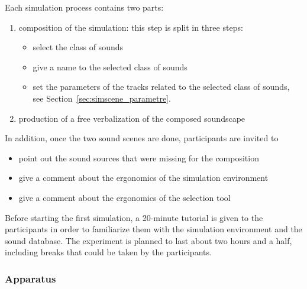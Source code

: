 \documentclass[twoside,twocolumn]{article}
\begin{document}
Each simulation process contains two parts:
\begin{enumerate}
\item composition of the simulation: this step is split in three steps:
\begin{itemize}
  \item  select the class of sounds
	\item  give a name to the selected class of sounds
	\item  set the parameters of the tracks related to the selected class of sounds, see Section~\ref{sec:simscene_parametre}.
\end{itemize}
\item production of a free verbalization of the composed soundscape
\end{enumerate}

In addition, once the two sound scenes are done, participants are invited to
\begin{itemize}
\item  point out the sound sources that were missing for the composition
\item  give a comment about the ergonomics of the simulation environment
\item   give a comment about the ergonomics of the selection tool
\end{itemize}

Before starting the first simulation, a 20-minute tutorial is given to the participants in order to familiarize them with the simulation environment and the sound database. The experiment is planned to last about two hours and a half, including breaks that could be taken by the participants.

\subsubsection*{Apparatus}

%
%
\end{document}
